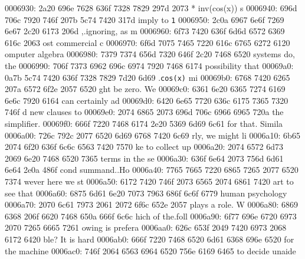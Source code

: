\begin{bo
00010e0: 7865 647d 5c62 6567 696e 7b76 6572 6261  xed}
\begin{verba
00010f0: 7469 6d7d 0a20 2023 7479 7065 2074 6572  tim}
\begin{
0001c40: 7665 7262 6174 696d 7d0a 2020 236c 6574  verbatim}
\begin{boxe
00027a0: 647d 5c62 6567 696e 7b76 6572 6261 7469  d}
\begin{verbati
00027b0: 6d7d 0a20 2023 6c65 7420 696e 6669 7865  m}
\begin{v
0002c60: 6572 6261 7469 6d7d 0a20 2023 6c65 7420  erbatim}
\begin{
0002dc0: 7665 7262 6174 696d 7d0a 2020 236c 6574  verbatim}
\begin{boxed
0002f30: 7d5c 6265 6769 6e7b 7665 7262 6174 696d  }
\begin{verbatim
0002f40: 7d0a 2020 236c 6574 2068 6428 683a 3a74  }
\begin{v
0003e60: 6572 6261 7469 6d7d 0a20 2023 236f 7065  erbatim}
\begin{boxed
00042b0: 7d5c 6265 6769 6e7b 7665 7262 6174 696d  }
\begin{verbatim
00042c0: 7d0a 2020 2328 782c 7429 3b3b 0a20 202d  }
\begin{boxed}
\begin{boxed}
{0006930: 2a20 696e 7628 636f 7328 7829 297d 2073  * inv(cos(x))} s
0006940: 696d 706c 7920 746f 207b 5c74 7420 317d  imply to {\tt 1}
0006950: 2c0a 6967 6e6f 7269 6e67 2c20 6173 206d  ,.ignoring, as m
0006960: 6f73 7420 636f 6d6d 6572 6369 616c 2063  ost commercial c
0006970: 6f6d 7075 7465 7220 616c 6765 6272 6120  omputer algebra 
0006980: 7379 7374 656d 7320 646f 2c20 7468 6520  systems do, the 
0006990: 706f 7373 6962 696c 6974 7920 7468 6174  possibility that
00069a0: 0a7b 5c74 7420 636f 7328 7829 7d20 6d69  .{\tt cos(x)} mi
00069b0: 6768 7420 6265 207a 6572 6f2e 2057 6520  ght be zero. We 
00069c0: 6361 6e20 6365 7274 6169 6e6c 7920 6164  can certainly ad
00069d0: 6420 6e65 7720 636c 6175 7365 7320 746f  d new clauses to
00069e0: 2074 6865 2073 696d 706c 6966 6965 720a   the simplifier.
00069f0: 666f 7220 7468 6174 2e20 5369 6d69 6c61  for that. Simila
0006a00: 726c 792c 2077 6520 6d69 6768 7420 6c69  rly, we might li
0006a10: 6b65 2074 6f20 636f 6c6c 6563 7420 7570  ke to collect up
0006a20: 2074 6572 6d73 2069 6e20 7468 6520 7365   terms in the se
0006a30: 636f 6e64 2073 756d 6d61 6e64 2e0a 486f  cond summand..Ho
0006a40: 7765 7665 7220 6865 7265 2077 6520 7374  wever here we st
0006a50: 6172 7420 746f 2073 6565 2074 6861 7420  art to see that 
0006a60: 6875 6d61 6e20 7073 7963 686f 6c6f 6779  human psychology
0006a70: 2070 6c61 7973 2061 2072 6f6c 652e 2057   plays a role. W
0006a80: 6869 6368 206f 6620 7468 650a 666f 6c6c  hich of the.foll
0006a90: 6f77 696e 6720 6973 2070 7265 6665 7261  owing is prefera
0006aa0: 626c 653f 2049 7420 6973 2068 6172 6420  ble? It is hard 
0006ab0: 666f 7220 7468 6520 6d61 6368 696e 6520  for the machine 
0006ac0: 746f 2064 6563 6964 6520 756e 6169 6465  to decide unaide

\end{boxed}
\end{boxed}
\end{verbatim
00042c0: 7d0a 2020 2328 782c 7429 3b3b 0a20 202d  }
\end{boxed
00042b0: 7d5c 6265 6769 6e7b 7665 7262 6174 696d  }
\end{v
0003e60: 6572 6261 7469 6d7d 0a20 2023 236f 7065  erbatim}
\end{verbatim
0002f40: 7d0a 2020 236c 6574 2068 6428 683a 3a74  }
\end{boxed
0002f30: 7d5c 6265 6769 6e7b 7665 7262 6174 696d  }
\end{
0002dc0: 7665 7262 6174 696d 7d0a 2020 236c 6574  verbatim}
\end{v
0002c60: 6572 6261 7469 6d7d 0a20 2023 6c65 7420  erbatim}
\end{verbati
00027b0: 6d7d 0a20 2023 6c65 7420 696e 6669 7865  m}
\end{boxe
00027a0: 647d 5c62 6567 696e 7b76 6572 6261 7469  d}
\end{
0001c40: 7665 7262 6174 696d 7d0a 2020 236c 6574  verbatim}
\end{verba
00010f0: 7469 6d7d 0a20 2023 7479 7065 2074 6572  tim}
\end{bo
00010e0: 7865 647d 5c62 6567 696e 7b76 6572 6261  xed}
